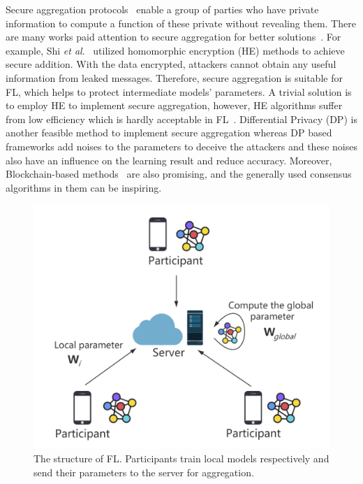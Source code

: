 Secure aggregation protocols~\cite{shi2011privacy} enable a group of parties who have private information to compute a function of these private without revealing them. There are many works paid attention to secure aggregation for better solutions~\cite{shi2011privacy,RobustAgg,Bonawitz19,Nike,PrivFL}. For example, Shi \emph{et al}.~\cite{shi2011privacy} utilized homomorphic encryption (HE) methods to achieve secure addition. With the data encrypted, attackers cannot obtain any useful information from leaked messages. Therefore, secure aggregation is suitable for FL, which helps to protect intermediate models' parameters. A trivial solution is to employ HE to implement secure aggregation, however, HE algorithms suffer from low efficiency which is hardly acceptable in FL~\cite{HESurvey}. Differential Privacy (DP) is another feasible method to implement secure aggregation whereas DP based frameworks add noises to the parameters to deceive the attackers and these noises also have an influence on the learning result and reduce accuracy. Moreover, Blockchain-based methods~\cite{DeepChain,Lu2020,On-Device} are also promising, and the generally used consensus algorithms in them can be inspiring. 

\begin{figure}[!ht]
    \centering
    \includegraphics[width=\columnwidth]{img/fed.png}
    \caption{The structure of FL. Participants train local models respectively and send their parameters to the server for aggregation.}
    \label{fed}
\end{figure}

